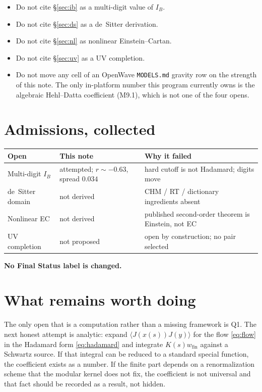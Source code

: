 \documentclass[11pt]{article}
\theoremstyle{definition}
\newcommand{\IB}{I_B}
\begin{document}
\begin{itemize}[leftmargin=1.4em]
\item Do not cite \S\ref{sec:ib} as a multi-digit value of $\IB$.
\item Do not cite \S\ref{sec:ds} as a de~Sitter derivation.
\item Do not cite \S\ref{sec:nl} as nonlinear Einstein--Cartan.
\item Do not cite \S\ref{sec:uv} as a UV completion.
\item Do not move any cell of an OpenWave \texttt{MODELS.md} gravity
row on the strength of this note. The only in-platform number this
program currently owns is the algebraic Hehl--Datta coefficient
(M9.1), which is not one of the four opens.
\end{itemize}

\section{Admissions, collected}

\begin{center}
\begin{tabular}{@{}p{}p{}p{}@{}}
\toprule
Open & This note & Why it failed \\
\midrule
Multi-digit $\IB$ &
attempted; $r\sim -0.63$, spread $0.034$ &
hard cutoff is not Hadamard; digits move \\
de~Sitter domain &
not derived &
CHM / RT / dictionary ingredients absent \\
Nonlinear EC &
not derived &
published second-order theorem is Einstein, not EC \\
UV completion &
not proposed &
open by construction; no pair selected \\
\bottomrule
\end{tabular}
\end{center}

\noindent
\textbf{No Final Status label is changed.}

\section{What remains worth doing}

The only open that is a computation rather than a missing framework
is Q1. The next honest attempt is analytic: expand
$\langle J(x(s))J(y)\rangle$ for the flow \eqref{eq:flow} in the
Hadamard form \eqref{eq:hadamard} and integrate $K(s)w_{\mathrm{fin}}$
against a Schwartz source. If that integral can be reduced to a
standard special function, the coefficient exists as a number. If
the finite part depends on a renormalization scheme that the
modular kernel does not fix, the coefficient is not universal and
that fact should be recorded as a result, not hidden.
\end{document}

